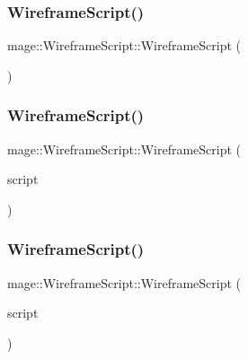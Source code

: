 \subsubsection{\texorpdfstring{Wireframe\+Script()}{WireframeScript()}\hspace{0.1cm}{\footnotesize\ttfamily [1/3]}}
{\footnotesize\ttfamily mage\+::\+Wireframe\+Script\+::\+Wireframe\+Script (\begin{DoxyParamCaption}{ }\end{DoxyParamCaption})}

\hypertarget{classmage_1_1_wireframe_script_abd35f16fba0de4d370728e832d757473}{}\label{classmage_1_1_wireframe_script_abd35f16fba0de4d370728e832d757473} 
\subsubsection{\texorpdfstring{Wireframe\+Script()}{WireframeScript()}\hspace{0.1cm}{\footnotesize\ttfamily [2/3]}}
{\footnotesize\ttfamily mage\+::\+Wireframe\+Script\+::\+Wireframe\+Script (\begin{DoxyParamCaption}\item[{const \hyperlink{classmage_1_1_wireframe_script}{Wireframe\+Script} \&}]{script }\end{DoxyParamCaption})\hspace{0.3cm}{\ttfamily [delete]}}

\hypertarget{classmage_1_1_wireframe_script_a465b1b144af8376b2f9afdd11c51af98}{}\label{classmage_1_1_wireframe_script_a465b1b144af8376b2f9afdd11c51af98} 
\subsubsection{\texorpdfstring{Wireframe\+Script()}{WireframeScript()}\hspace{0.1cm}{\footnotesize\ttfamily [3/3]}}
{\footnotesize\ttfamily mage\+::\+Wireframe\+Script\+::\+Wireframe\+Script (\begin{DoxyParamCaption}\item[{\hyperlink{classmage_1_1_wireframe_script}{Wireframe\+Script} \&\&}]{script }\end{DoxyParamCaption})\hspace{0.3cm}{\ttfamily [default]}}

